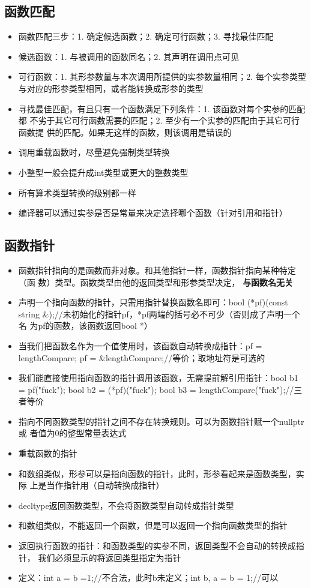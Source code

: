 \documentclass[11pt]{article}
\begin{document}
\subsection{函数匹配}
\label{sec-4-5}
\begin{itemize}
\item 函数匹配三步：1. 确定候选函数；2. 确定可行函数；3. 寻找最佳匹配
\item 候选函数：1. 与被调用的函数同名；2. 其声明在调用点可见
\item 可行函数：1. 其形参数量与本次调用所提供的实参数量相同；2. 每个实参类型
与对应的形参类型相同，或者能转换成形参的类型
\item 寻找最佳匹配，有且只有一个函数满足下列条件：1. 该函数对每个实参的匹配都
不劣于其它可行函数需要的匹配；2. 至少有一个实参的匹配由于其它可行函数提
供的匹配。如果无这样的函数，则该调用是错误的
\item 调用重载函数时，尽量避免强制类型转换
\item 小整型一般会提升成int类型或更大的整数类型
\item 所有算术类型转换的级别都一样
\item 编译器可以通过实参是否是常量来决定选择哪个函数（针对引用和指针）
\end{itemize}
\subsection{函数指针}
\label{sec-4-6}
\begin{itemize}
\item 函数指针指向的是函数而非对象。和其他指针一样，函数指针指向某种特定（函
数）类型。函数类型由他的返回类型和形参类型决定， \textbf{与函数名无关}
\item 声明一个指向函数的指针，只需用指针替换函数名即可：bool (*pf)(const
string \&);//未初始化的指针pf，*pf两端的括号必不可少（否则成了声明一个名
为pf的函数，该函数返回bool *）
\item 当我们把函数名作为一个值使用时，该函数自动转换成指针：pf =
lengthCompare; pf = \&lengthCompare;//等价；取地址符是可选的
\item 我们能直接使用指向函数的指针调用该函数，无需提前解引用指针：bool b1 =
pf("fuck"); bool b2 = (*pf)("fuck"); bool b3 =
lengthCompare("fuck");//三者等价
\item 指向不同函数类型的指针之间不存在转换规则。可以为函数指针赋一个nullptr或
者值为0的整型常量表达式
\item 重载函数的指针
\item 和数组类似，形参可以是指向函数的指针，此时，形参看起来是函数类型，实际
上是当作指针用（自动转换成指针）
\item decltype返回函数类型，不会将函数类型自动转成指针类型
\item 和数组类似，不能返回一个函数，但是可以返回一个指向函数类型的指针
\item 返回执行函数的指针：和函数类型的实参不同，返回类型不会自动的转换成指针，
我们必须显示的将返回类型指定为指针
\item 定义：int a = b =1;//不合法，此时b未定义；int b, a = b = 1;//可以
\end{itemize}
\end{document}
